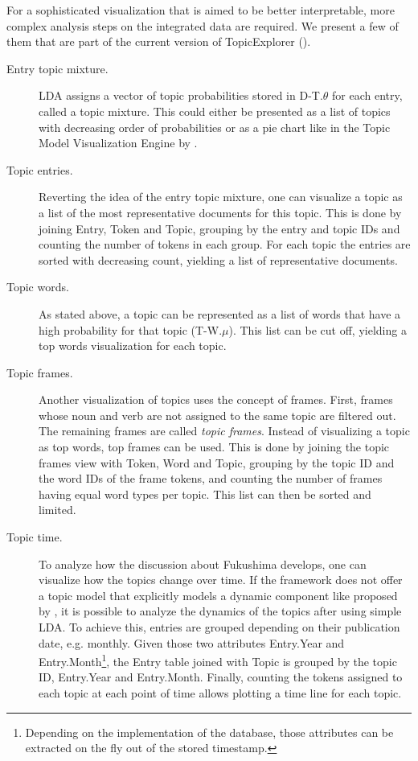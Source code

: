 For a sophisticated visualization that is aimed to be better interpretable, more complex analysis steps on the integrated data are required. We present a few of them that are part of the current version of TopicExplorer (\cite{hinneburg2014topic}).

\begin{description}
\item[Entry topic mixture.] LDA assigns a vector of topic probabilities stored in D-T.$\theta$ for each entry, called a topic mixture. This could either be presented as a list of topics with decreasing order of probabilities or as a pie chart like in the Topic Model Visualization Engine by \textcite{chaney2012visualizing}.

\item[Topic entries.] Reverting the idea of the entry topic mixture, one can visualize a topic as a list of the most representative documents for this topic. This is done by joining Entry, Token and Topic, grouping by the entry and topic IDs and counting the number of tokens in each group. For each topic the entries are sorted with decreasing count, yielding a list of representative documents.

\item[Topic words.] As stated above, a topic can be represented as a list of words that have a high probability for that topic (T-W.$\mu$). This list can be cut off, yielding a top words visualization for each topic.

\item[Topic frames.] Another visualization of topics uses the concept of frames. First, frames whose noun and verb are not assigned to the same topic are filtered out. The remaining frames are called \emph{topic frames}. Instead of visualizing a topic as top words, top frames can be used. This is done by joining the topic frames view with Token, Word and Topic, grouping by the topic ID and the word IDs of the frame tokens, and counting the number of frames having equal word types per topic. This list can then be sorted and limited.

\item[Topic time.] To analyze how the discussion about Fukushima develops, one can visualize how the topics change over time. If the framework does not offer a topic model that explicitly models a dynamic component like proposed by \textcite{blei2006dynamic}, it is possible to analyze the dynamics of the topics after using simple LDA. To achieve this, entries are grouped depending on their publication date, e.g. monthly. Given those two attributes Entry.Year and Entry.Month\footnote{Depending on the implementation of the database, those attributes can be extracted on the fly out of the stored timestamp.}, the Entry table joined with Topic is grouped by the topic ID, Entry.Year and Entry.Month. Finally, counting the tokens assigned to each topic at each point of time allows plotting a time line for each topic.
\end{description}

